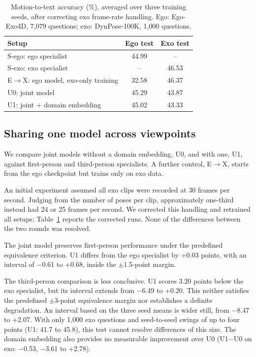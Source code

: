 \documentclass[10pt,twocolumn,letterpaper]{article}
\begin{document}
\begin{table}[t]
\centering\small
\setlength{\tabcolsep}{3pt}
\begin{tabular}{lcc}
\toprule
Setup & Ego test & Exo test \\
\midrule
S-ego: ego specialist & 44.99 & -- \\
S-exo: exo specialist & -- & 46.53 \\
E$\to$X: ego model, exo-only training & 32.58 & 46.37 \\
U0: joint model & 45.29 & 43.87 \\
U1: joint + domain embedding & 45.02 & 43.33 \\
\bottomrule
\end{tabular}
\caption{Motion-to-text accuracy (\%), averaged over three training seeds, after correcting exo frame-rate
handling. Ego: Ego-Exo4D, 7,079 questions; exo: DynPose-100K, 1,000 questions.}
\label{tab:egoexo}
\end{table}

\subsection{Sharing one model across viewpoints}
\label{sec:egoexo}
We compare joint models without a domain embedding, U0, and with one, U1, against first-person and third-person
specialists. A further control, E$\to$X, starts from the ego checkpoint but trains only on exo data.

An initial experiment assumed all exo clips were recorded at 30 frames per second. Judging from the number of poses
per clip, approximately one-third instead had 24 or 25 frames per second. We corrected this handling and retrained
all setups; Table~\ref{tab:egoexo} reports the corrected runs. None of the differences between the two rounds was
resolved.

The joint model preserves first-person performance under the predefined equivalence criterion. U1 differs from the
ego specialist by +0.03 points, with an interval of $-$0.61 to +0.68, inside the $\pm$1.5-point margin.

The third-person comparison is less conclusive. U1 scores 3.20 points below the exo specialist, but its interval
extends from $-$6.49 to +0.20. This neither satisfies the predefined $\pm$3-point equivalence margin nor establishes
a definite degradation. An interval based on the three seed means is wider still, from $-$8.47 to +2.07. With only
1,000 exo questions and seed-to-seed swings of up to four points (U1: 41.7 to 45.8), this test cannot resolve
differences of this size. The domain embedding also provides no measurable improvement over U0 (U1$-$U0 on exo:
$-$0.53, $-$3.61 to +2.78).
\end{document}
